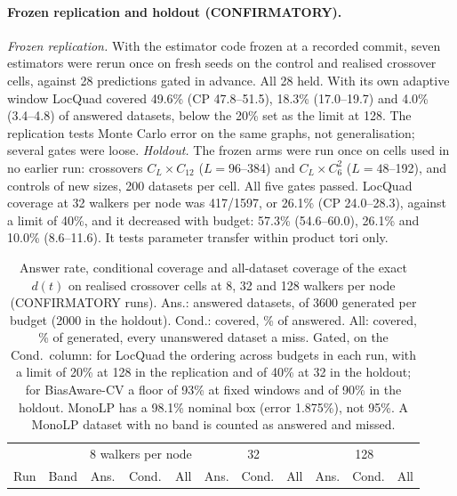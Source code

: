 \documentclass[aps,pre,twocolumn,superscriptaddress,nofootinbib,10pt]{revtex4-2}
\newcommand{\nm}[1]{\textsf{#1}}
\newcommand{\LQ}{\nm{LocQuad}}
\newcommand{\BAC}{\nm{BiasAware-CV}}
\newcommand{\MLP}{\nm{MonoLP}}
\begin{document}
\paragraph*{Frozen replication and holdout (CONFIRMATORY).}
\emph{Frozen replication.} With the estimator code frozen at a recorded commit, seven estimators were rerun once on fresh seeds on the control and realised crossover cells, against 28 predictions gated in advance. All 28 held. With its own adaptive window \textsf{LocQuad} covered 49.6\% (CP 47.8--51.5), 18.3\% (17.0--19.7) and 4.0\% (3.4--4.8) of answered datasets, below the 20\% set as the limit at 128. The replication tests Monte Carlo error on the same graphs, not generalisation; several gates were loose. \emph{Holdout.} The frozen arms were run once on cells used in no earlier run: crossovers $C_L\times C_{12}$ ($L=96$--384) and $C_L\times C_6^2$ ($L=48$--192), and controls of new sizes, 200 datasets per cell. All five gates passed. \textsf{LocQuad} coverage at 32 walkers per node was 417/1597, or 26.1\% (CP 24.0--28.3), against a limit of 40\%, and it decreased with budget: 57.3\% (54.6--60.0), 26.1\% and 10.0\% (8.6--11.6). It tests parameter transfer within product tori only.

\begin{table}[t]
\caption{Answer rate, conditional coverage and all-dataset coverage of the exact $d(t)$ on realised crossover cells at 8, 32 and 128 walkers per node (CONFIRMATORY runs). Ans.: answered datasets, of 3600 generated per budget (2000 in the holdout). Cond.: covered, \% of answered. All: covered, \% of generated, every unanswered dataset a miss. Gated, on the Cond.\ column: for \LQ{} the ordering across budgets in each run, with a limit of 20\% at 128 in the replication and of 40\% at 32 in the holdout; for \BAC{} a floor of 93\% at fixed windows and of 90\% in the holdout. \MLP{} has a 98.1\% nominal box (error 1.875\%), not 95\%. A \MLP{} dataset with no band is counted as answered and missed.}
\label{tab:joint}
\begin{ruledtabular}
\footnotesize
\begin{tabular}{llccccccccc}
 & & \multicolumn{3}{c}{8 walkers per node} & \multicolumn{3}{c}{32} & \multicolumn{3}{c}{128} \\
Run & Band & Ans. & Cond. & All & Ans. & Cond. & All & Ans. & Cond. & All \\
\hline

\end{tabular}
\end{ruledtabular}
\end{table}
\end{document}

